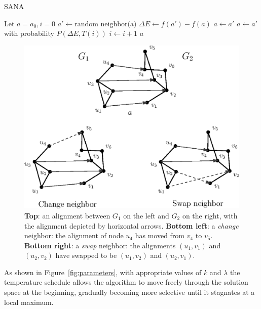 \documentclass{bioinfo}
\begin{document}
\begin{methods}
\begin{algorithm}
\caption{SANA}\label{alg:SANA}
\begin{algorithmic}[1]
\State Let $a=a_0, i=0$
\State $a'\gets \mbox{random neighbor(a)}$
\State $\Delta E \gets f(a')-f(a)$
 $a\gets a'$
\Else \State $a\gets a'$ with probability $P(\Delta E, T(i))$
\EndIf
\State $i \gets i+1$
\EndWhile
\State \Return $a$
\end{algorithmic}
\end{algorithm}

\begin{figure}
\centering
\includegraphics[width=0.7\linewidth]{./operators.eps}
\caption{{\bf Top}: an alignment between $G_1$ on the left and $G_2$ on the right, with the alignment depicted by horizontal arrows.
{\bf Bottom left}: a {\it change} neighbor: the alignment of node $u_4$ has moved from $v_4$ to $v_5$.
{\bf Bottom right}: a {\it swap} neighbor: the alignments $(u_1,v_1)$ and $(u_2,v_2)$ have swapped to be $(u_1,v_2)$ and $(u_2,v_1)$.}
\label{fig:operators}
\end{figure}

As shown in Figure~\ref{fig:parameters}, with appropriate values of $k$ and $\lambda$ the temperature schedule allows the algorithm to move freely through the solution space at the beginning, gradually becoming more selective until it stagnates at a local maximum.


\end{methods}
\end{document}
